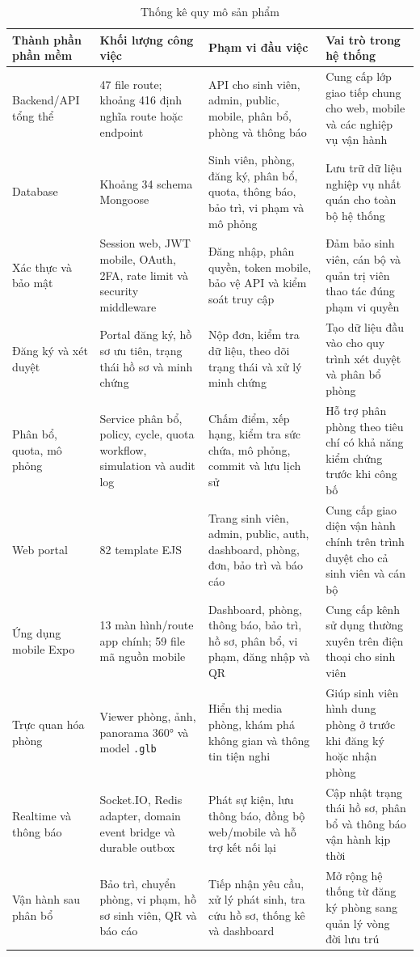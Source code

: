 \documentclass[../DoAn.tex]{subfiles}
\begin{document}
\begin{table}[H]
\centering
\caption{Thống kê quy mô sản phẩm}
\label{tab:product_scale}
\footnotesize
\setlength{\tabcolsep}{3pt}
\renewcommand{\arraystretch}{1.15}
\begin{tabular}{|p{2.8cm}|p{3.1cm}|p{3.8cm}|p{3.9cm}|}
\hline
\textbf{Thành phần phần mềm} & \textbf{Khối lượng công việc} & \textbf{Phạm vi đầu việc} & \textbf{Vai trò trong hệ thống} \\
\hline
Backend/API tổng thể & 47 file route; khoảng 416 định nghĩa route hoặc endpoint & API cho sinh viên, admin, public, mobile, phân bổ, phòng và thông báo & Cung cấp lớp giao tiếp chung cho web, mobile và các nghiệp vụ vận hành \\
\hline
Database & Khoảng 34 schema Mongoose & Sinh viên, phòng, đăng ký, phân bổ, quota, thông báo, bảo trì, vi phạm và mô phỏng & Lưu trữ dữ liệu nghiệp vụ nhất quán cho toàn bộ hệ thống \\
\hline
Xác thực và bảo mật & Session web, JWT mobile, OAuth, 2FA, rate limit và security middleware & Đăng nhập, phân quyền, token mobile, bảo vệ API và kiểm soát truy cập & Đảm bảo sinh viên, cán bộ và quản trị viên thao tác đúng phạm vi quyền \\
\hline
Đăng ký và xét duyệt & Portal đăng ký, hồ sơ ưu tiên, trạng thái hồ sơ và minh chứng & Nộp đơn, kiểm tra dữ liệu, theo dõi trạng thái và xử lý minh chứng & Tạo dữ liệu đầu vào cho quy trình xét duyệt và phân bổ phòng \\
\hline
Phân bổ, quota, mô phỏng & Service phân bổ, policy, cycle, quota workflow, simulation và audit log & Chấm điểm, xếp hạng, kiểm tra sức chứa, mô phỏng, commit và lưu lịch sử & Hỗ trợ phân phòng theo tiêu chí có khả năng kiểm chứng trước khi công bố \\
\hline
Web portal & 82 template EJS & Trang sinh viên, admin, public, auth, dashboard, phòng, đơn, bảo trì và báo cáo & Cung cấp giao diện vận hành chính trên trình duyệt cho cả sinh viên và cán bộ \\
\hline
Ứng dụng mobile Expo & 13 màn hình/route app chính; 59 file mã nguồn mobile & Dashboard, phòng, thông báo, bảo trì, hồ sơ, phân bổ, vi phạm, đăng nhập và QR & Cung cấp kênh sử dụng thường xuyên trên điện thoại cho sinh viên \\
\hline
Trực quan hóa phòng & Viewer phòng, ảnh, panorama 360° và model \texttt{.glb} & Hiển thị media phòng, khám phá không gian và thông tin tiện nghi & Giúp sinh viên hình dung phòng ở trước khi đăng ký hoặc nhận phòng \\
\hline
Realtime và thông báo & Socket.IO, Redis adapter, domain event bridge và durable outbox & Phát sự kiện, lưu thông báo, đồng bộ web/mobile và hỗ trợ kết nối lại & Cập nhật trạng thái hồ sơ, phân bổ và thông báo vận hành kịp thời \\
\hline
Vận hành sau phân bổ & Bảo trì, chuyển phòng, vi phạm, hồ sơ sinh viên, QR và báo cáo & Tiếp nhận yêu cầu, xử lý phát sinh, tra cứu hồ sơ, thống kê và dashboard & Mở rộng hệ thống từ đăng ký phòng sang quản lý vòng đời lưu trú \\
\hline
\end{tabular}
\end{table}
\end{document}

